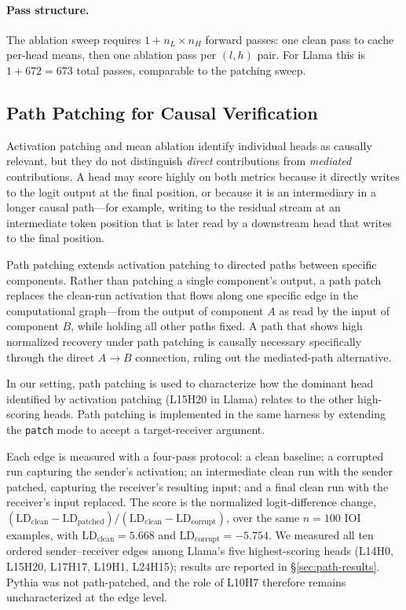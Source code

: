 \documentclass[11pt,a4paper]{article}
\begin{document}
\paragraph{Pass structure.}
The ablation sweep requires $1 + n_L \times n_H$ forward passes: one clean pass to
cache per-head means, then one ablation pass per $(l, h)$ pair. For Llama this is
$1 + 672 = 673$ total passes, comparable to the patching sweep.

\subsection{Path Patching for Causal Verification}
\label{sec:path-patching}

Activation patching and mean ablation identify individual heads as causally relevant,
but they do not distinguish \emph{direct} contributions from \emph{mediated}
contributions. A head may score highly on both metrics because it directly writes to
the logit output at the final position, or because it is an intermediary in a longer
causal path---for example, writing to the residual stream at an intermediate token
position that is later read by a downstream head that writes to the final position.

Path patching \citep{goldowsky2023localizing} extends activation patching to directed
paths between specific components. Rather than patching a single component's output, a
path patch replaces the clean-run activation that flows along one specific edge in the
computational graph---from the output of component $A$ as read by the input of
component $B$, while holding all other paths fixed. A path that shows high normalized
recovery under path patching is causally necessary specifically through the direct
$A \to B$ connection, ruling out the mediated-path alternative.

In our setting, path patching is used to characterize how the dominant head identified
by activation patching (L15H20 in Llama) relates to the other high-scoring heads. Path
patching is implemented in the same harness by extending the \texttt{patch} mode to
accept a target-receiver argument.

Each edge is measured with a four-pass protocol: a clean baseline; a corrupted run
capturing the sender's activation; an intermediate clean run with the sender patched,
capturing the receiver's resulting input; and a final clean run with the receiver's
input replaced. The score is the normalized logit-difference change,
$(\mathrm{LD}_{\text{clean}} - \mathrm{LD}_{\text{patched}}) /
(\mathrm{LD}_{\text{clean}} - \mathrm{LD}_{\text{corrupt}})$, over the same
$n = 100$ IOI examples, with
$\mathrm{LD}_{\text{clean}} = 5.668$ and
$\mathrm{LD}_{\text{corrupt}} = -5.754$. We measured all ten ordered sender--receiver
edges among Llama's five highest-scoring heads (L14H0, L15H20, L17H17, L19H1, L24H15);
results are reported in \S\ref{sec:path-results}. Pythia was not path-patched, and the
role of L10H7 therefore remains uncharacterized at the edge level.
\end{document}
